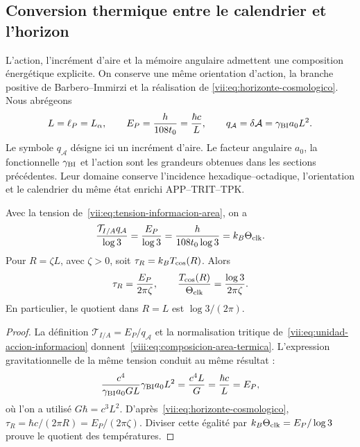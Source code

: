 
\subsection{Conversion thermique entre le calendrier et l'horizon}
\label{viii:subsec:conversion-termica-calendario-horizonte}

L'action, l'incrément d'aire et la mémoire angulaire admettent une composition énergétique explicite. On conserve une même orientation d'action, la branche positive de Barbero--Immirzi et la réalisation de \eqref{vii:eq:horizonte-cosmologico}. Nous abrégeons
\[
 L=\ell_P=L_\alpha,\qquad
 E_P=\frac{h}{108t_0}=\frac{\hbar c}{L},\qquad
 q_{\mathcal A}=\delta\mathcal A=\gamma_{\rm BI}a_0L^2.
\]
Le symbole \(q_{\mathcal A}\) désigne ici un incrément d'aire.
Le facteur angulaire \(a_0\), la fonctionnelle \(\gamma_{\rm BI}\) et
l'action sont les grandeurs obtenues dans les sections précédentes.
Leur domaine conserve l'incidence hexadique--octadique, l'orientation et
le calendrier du même état enrichi APP--TRIT--TPK.

\begin{proposition}
\label{viii:prop:composicion-area-termica}
Avec la tension de~\eqref{vii:eq:tension-informacion-area}, on a
\begin{equation}
 \frac{\mathcal T_{I/A}q_{\mathcal A}}{\log3}
 =\frac{E_P}{\log3}
 =\frac{h}{108t_0\log3}
 =k_B\Theta_{\rm clk}.
 \label{viii:eq:composicion-area-termica}
\end{equation}
Pour \(R=\zeta L\), avec \(\zeta>0\), soit
\(\tau_R=k_BT_{\rm cos}(R)\). Alors
\begin{equation}
 \tau_R=\frac{E_P}{2\pi\zeta},\qquad
 \frac{T_{\rm cos}(R)}{\Theta_{\rm clk}}
 =\frac{\log3}{2\pi\zeta}.
 \label{viii:eq:conversion-dos-temperaturas}
\end{equation}
En particulier, le quotient dans \(R=L\) est \(\log3/(2\pi)\).
\end{proposition}
\begin{proof}
La définition \(\mathcal T_{I/A}=E_P/q_{\mathcal A}\) et la
normalisation tritique de~\eqref{vii:eq:unidad-accion-informacion}
donnent~\eqref{viii:eq:composicion-area-termica}. L'expression
gravitationnelle de la même tension conduit au même résultat :
\[
 \frac{c^4}{\gamma_{\rm BI}a_0GL}
        \gamma_{\rm BI}a_0L^2
 =\frac{c^4L}{G}=\frac{\hbar c}{L}=E_P,
\]
où l'on a utilisé \(G\hbar=c^3L^2\).
D'après~\eqref{vii:eq:horizonte-cosmologico},
\(\tau_R=\hbar c/(2\pi R)=E_P/(2\pi\zeta)\).
Diviser cette égalité par \(k_B\Theta_{\rm clk}=E_P/\log3\)
prouve le quotient des températures.
\end{proof}

